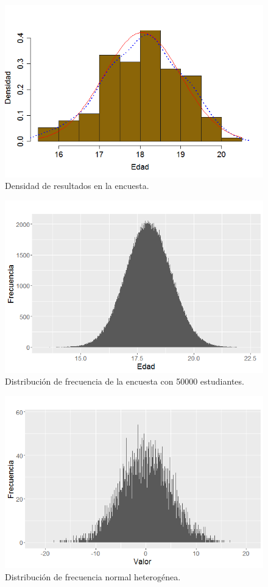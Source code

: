 \documentclass[]{article}
\begin{document}
\begin{figure}[b]
    \centering
    \includegraphics[width=.5\linewidth]{Densidad.png}    \caption{Densidad de resultados en la encuesta.}
    \label{fig:Densidad}
\end{figure}

\begin{figure}[b]
    \centering
    \includegraphics[width=.5\linewidth]{Ideal.png}    \caption{Distribución de frecuencia de la encuesta con 50000 estudiantes.}
    \label{fig:Regular}
\end{figure}

\begin{figure}[b]
    \centering
    \includegraphics[width=.5\linewidth]{Heterogenea.png}    \caption{Distribución de frecuencia normal heterogénea.}
    \label{fig:Heterogenea}
\end{figure}
\end{document}
